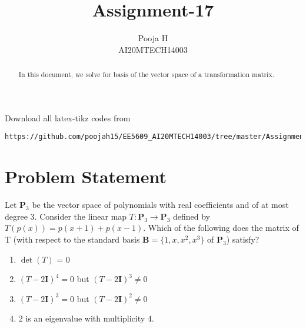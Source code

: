 \documentclass[journal,12pt,twocolumn]{IEEEtran}
\begin{document}
	\makeatother
	\let\StandardTheFigure\thefigure
	\let\vec\mathbf
	\renewcommand{\thefigure}{\theproblem}
	\def\putbox#1#2#3{\makebox[0in][l]{\makebox[#1][l]{}\raisebox{\baselineskip}[0in][0in]{\raisebox{#2}[0in][0in]{#3}}}}
	\def\rightbox#1{\makebox[0in][r]{#1}}
	\def\centbox#1{\makebox[0in]{#1}}
	\def\topbox#1{\raisebox{-\baselineskip}[0in][0in]{#1}}
	\def\midbox#1{\raisebox{-0.5\baselineskip}[0in][0in]{#1}}
	\vspace{3cm}
	\title{Assignment-17}
	\author{Pooja H \\ AI20MTECH14003}
	\maketitle
	\newpage
	\bigskip
	\renewcommand{\thefigure}{\theenumi}
	\renewcommand{\thetable}{\theenumi}
	\begin{abstract}
		In this document, we solve for basis of the vector space of a transformation matrix.
	\end{abstract}
	Download all latex-tikz codes from 
\begin{lstlisting}
https://github.com/poojah15/EE5609_AI20MTECH14003/tree/master/Assignment_17
\end{lstlisting}
	\section{Problem Statement}
	
	
	
Let ${\vec{P}_{3}}$ be the vector space of polynomials with real coefficients and of at most degree 3. Consider the linear map $T:\vec{P}_3 \rightarrow \vec{P}_3$ defined by $T(p(x)) = p(x+1)+p(x-1)$. Which of the following does the matrix of T (with respect to the standard basis $\vec{B} =\{1, x, x^2, x^3\}$ of $\vec{P}_3$) satisfy?
\begin{enumerate}
\item  $\det(T)$ = 0 
\item $(T-2\vec{I})^4=0$ but $(T-2\vec{I})^3 \ne 0$
\item $(T-2\vec{I})^3=0$ but $(T-2\vec{I})^2 \ne 0$
\item 2 is an eigenvalue with multiplicity 4.
\end{enumerate}
\end{document}
